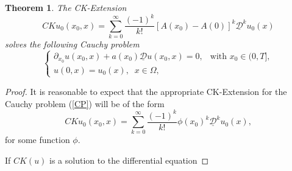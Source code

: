 \documentclass[12pt]{amsart}
\newcommand{\D}{\mathcal{D}}
\newtheorem{theorem}{Theorem}[section]
\theoremstyle{definition}
\begin{document}
\begin{theorem}
    The CK-Extension
    \[
        CKu_0(x_0, x) = \sum_{k = 0}^\infty \frac{(-1)^k}{k!}[A(x_0)-A(0)]^k\underline{\D}^ku_0(x)
    \]
    solves the following Cauchy problem
    \[
    \begin{cases}
    \partial_{x_0} u(x_0,x) + a(x_0)\underline{\D} u(x_0,x) = 0, & \text{with } x_0 \in (0, T], \\
    u(0,x) = u_0(x),\;\; x\in \Omega,
    \end{cases} 
    \]
    
\end{theorem}
\begin{proof}
It is reasonable to expect that the appropriate CK-Extension for the Cauchy problem (\ref{CP}) will be of the form
\[
CKu_0(x_0, x)=\sum_{k = 0}^\infty \frac{(-1)^k}{k!}\phi(x_0)^k\underline{\D}^ku_0(x),
\]
for some function $\phi$.

If $CK(u)$ is a solution to the differential equation


\end{proof}
\end{document}
